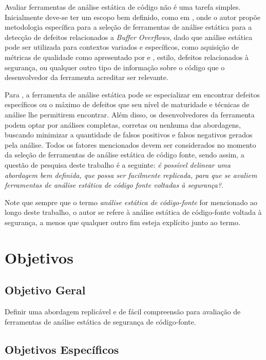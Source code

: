 Avaliar ferramentas de análise estática de código não é uma tarefa simples.
Inicialmente deve-se ter um escopo bem definido, como em \cite{harvard}, onde o autor propõe metodologia específica para a seleção de ferramentas de análise estática para a detecção de defeitos relacionados a \textit{Buffer Overflows}, dado que análise estática pode ser utilizada para contextos variados e específicos, como aquisição de métricas de qualidade como apresentado por \cite{meirelles2013} e \cite{analizoartigo}, estilo, defeitos relacionados à segurança, ou qualquer outro tipo de informação sobre o código que o desenvolvedor da ferramenta acreditar ser relevante.

Para \cite{secure_programming}, a ferramenta de análise estática pode se especializar em encontrar defeitos específicos ou o máximo de defeitos que seu nível de maturidade e técnicas de análise lhe permitirem encontrar. Além disso, os desenvolvedores da ferramenta podem optar por análises completas, corretas ou nenhuma das abordagens, buscando minimizar a quantidade de falsos positivos e falsos negativos gerados pela análise. Todos os fatores mencionados devem ser considerados no momento da seleção de ferramentas de análise estática de código fonte, sendo assim, a questão de pesquisa deste trabalho é a seguinte: \textit{é possível delinear uma abordagem bem definida, que possa ser facilmente replicada, para que se avaliem ferramentas de análise estática de código fonte voltadas à segurança?}.

Note que sempre que o termo \textit{análise estática de código-fonte} for mencionado ao longo deste trabalho, o autor se refere à análise estática de código-fonte voltada à segurança, a menos que qualquer outro fim esteja explícito junto ao termo.

\section*{Objetivos}
\subsection*{Objetivo Geral}

Definir uma abordagem replicável e de fácil compreensão para avaliação de ferramentas de análise estática de segurança de código-fonte.

\subsection*{Objetivos Específicos}

